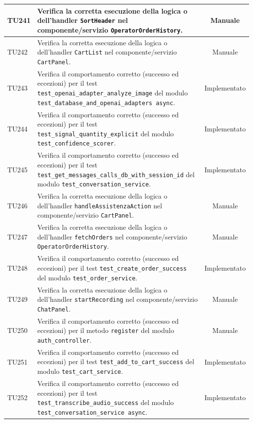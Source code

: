 \documentclass[a4paper,11pt,oneside]{scrartcl}
\begin{document}
\begin{longtable}{|p{1.9cm}|p{11.6cm}|c|}
    TU241 & Verifica la corretta esecuzione della logica o dell'handler \texttt{SortHeader} nel componente/servizio \texttt{OperatorOrderHistory}. & Manuale \\ \hline
    TU242 & Verifica la corretta esecuzione della logica o dell'handler \texttt{CartList} nel componente/servizio \texttt{CartPanel}. & Manuale \\ \hline
    TU243 & Verifica il comportamento corretto (successo ed eccezioni) per il test \texttt{test\_openai\_adapter\_analyze\_image} del modulo \texttt{test\_database\_and\_openai\_adapters async}. & Implementato \\ \hline
    TU244 & Verifica il comportamento corretto (successo ed eccezioni) per il test \texttt{test\_signal\_quantity\_explicit} del modulo \texttt{test\_confidence\_scorer}. & Implementato \\ \hline
    TU245 & Verifica il comportamento corretto (successo ed eccezioni) per il test \texttt{test\_get\_messages\_calls\_db\_with\_session\_id} del modulo \texttt{test\_conversation\_service}. & Implementato \\ \hline
    TU246 & Verifica la corretta esecuzione della logica o dell'handler \texttt{handleAssistenzaAction} nel componente/servizio \texttt{CartPanel}. & Manuale \\ \hline
    TU247 & Verifica la corretta esecuzione della logica o dell'handler \texttt{fetchOrders} nel componente/servizio \texttt{OperatorOrderHistory}. & Manuale \\ \hline
    TU248 & Verifica il comportamento corretto (successo ed eccezioni) per il test \texttt{test\_create\_order\_success} del modulo \texttt{test\_order\_service}. & Implementato \\ \hline
    TU249 & Verifica la corretta esecuzione della logica o dell'handler \texttt{startRecording} nel componente/servizio \texttt{ChatPanel}. & Manuale \\ \hline
    TU250 & Verifica il comportamento corretto (successo ed eccezioni) per il metodo \texttt{register} del modulo \texttt{auth\_controller}. & Manuale \\ \hline
    TU251 & Verifica il comportamento corretto (successo ed eccezioni) per il test \texttt{test\_add\_to\_cart\_success} del modulo \texttt{test\_cart\_service}. & Implementato \\ \hline
    TU252 & Verifica il comportamento corretto (successo ed eccezioni) per il test \texttt{test\_transcribe\_audio\_success} del modulo \texttt{test\_conversation\_service     async}. & Implementato \\ \hline

\end{longtable}
\end{document}
